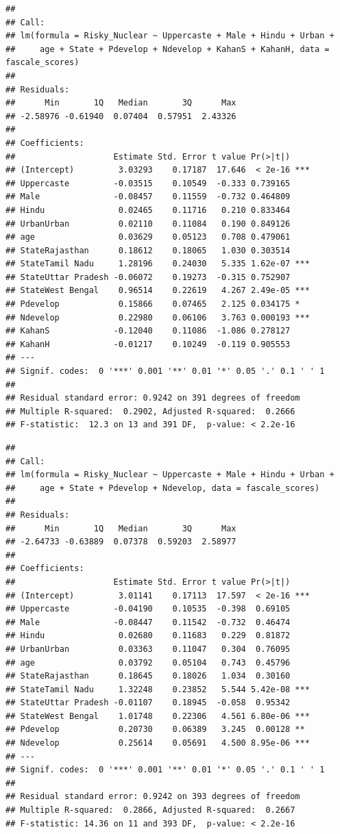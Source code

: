 \documentclass[
]{article}
\begin{document}
\begin{verbatim}
## 
## Call:
## lm(formula = Risky_Nuclear ~ Uppercaste + Male + Hindu + Urban + 
##     age + State + Pdevelop + Ndevelop + KahanS + KahanH, data = fascale_scores)
## 
## Residuals:
##      Min       1Q   Median       3Q      Max 
## -2.58976 -0.61940  0.07404  0.57951  2.43326 
## 
## Coefficients:
##                    Estimate Std. Error t value Pr(>|t|)    
## (Intercept)         3.03293    0.17187  17.646  < 2e-16 ***
## Uppercaste         -0.03515    0.10549  -0.333 0.739165    
## Male               -0.08457    0.11559  -0.732 0.464809    
## Hindu               0.02465    0.11716   0.210 0.833464    
## UrbanUrban          0.02110    0.11084   0.190 0.849126    
## age                 0.03629    0.05123   0.708 0.479061    
## StateRajasthan      0.18612    0.18065   1.030 0.303514    
## StateTamil Nadu     1.28196    0.24030   5.335 1.62e-07 ***
## StateUttar Pradesh -0.06072    0.19273  -0.315 0.752907    
## StateWest Bengal    0.96514    0.22619   4.267 2.49e-05 ***
## Pdevelop            0.15866    0.07465   2.125 0.034175 *  
## Ndevelop            0.22980    0.06106   3.763 0.000193 ***
## KahanS             -0.12040    0.11086  -1.086 0.278127    
## KahanH             -0.01217    0.10249  -0.119 0.905553    
## ---
## Signif. codes:  0 '***' 0.001 '**' 0.01 '*' 0.05 '.' 0.1 ' ' 1
## 
## Residual standard error: 0.9242 on 391 degrees of freedom
## Multiple R-squared:  0.2902, Adjusted R-squared:  0.2666 
## F-statistic:  12.3 on 13 and 391 DF,  p-value: < 2.2e-16
\end{verbatim}

\begin{verbatim}
## 
## Call:
## lm(formula = Risky_Nuclear ~ Uppercaste + Male + Hindu + Urban + 
##     age + State + Pdevelop + Ndevelop, data = fascale_scores)
## 
## Residuals:
##      Min       1Q   Median       3Q      Max 
## -2.64733 -0.63889  0.07378  0.59203  2.58977 
## 
## Coefficients:
##                    Estimate Std. Error t value Pr(>|t|)    
## (Intercept)         3.01141    0.17113  17.597  < 2e-16 ***
## Uppercaste         -0.04190    0.10535  -0.398  0.69105    
## Male               -0.08447    0.11542  -0.732  0.46474    
## Hindu               0.02680    0.11683   0.229  0.81872    
## UrbanUrban          0.03363    0.11047   0.304  0.76095    
## age                 0.03792    0.05104   0.743  0.45796    
## StateRajasthan      0.18645    0.18026   1.034  0.30160    
## StateTamil Nadu     1.32248    0.23852   5.544 5.42e-08 ***
## StateUttar Pradesh -0.01107    0.18945  -0.058  0.95342    
## StateWest Bengal    1.01748    0.22306   4.561 6.80e-06 ***
## Pdevelop            0.20730    0.06389   3.245  0.00128 ** 
## Ndevelop            0.25614    0.05691   4.500 8.95e-06 ***
## ---
## Signif. codes:  0 '***' 0.001 '**' 0.01 '*' 0.05 '.' 0.1 ' ' 1
## 
## Residual standard error: 0.9242 on 393 degrees of freedom
## Multiple R-squared:  0.2866, Adjusted R-squared:  0.2667 
## F-statistic: 14.36 on 11 and 393 DF,  p-value: < 2.2e-16
\end{verbatim}
\end{document}
